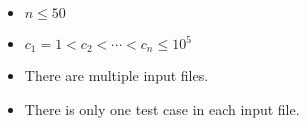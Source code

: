 \begin{itemize}
\tightlist
\item $n\le 50$
\item $c_1=1<c_2<\cdots<c_n\le10^5$
\item There are multiple input files.
\item There is only one test case in each input file.
\end{itemize}
\newpage
